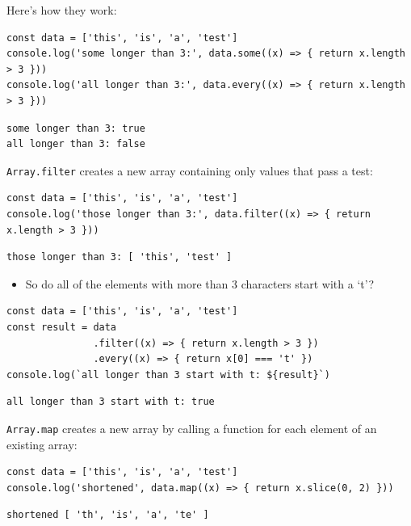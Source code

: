 Here's how they work:

\begin{verbatim}
const data = ['this', 'is', 'a', 'test']
console.log('some longer than 3:', data.some((x) => { return x.length > 3 }))
console.log('all longer than 3:', data.every((x) => { return x.length > 3 }))
\end{verbatim}

\begin{verbatim}
some longer than 3: true
all longer than 3: false
\end{verbatim}

\texttt{Array.filter} creates a new array containing only values that
pass a test:

\begin{verbatim}
const data = ['this', 'is', 'a', 'test']
console.log('those longer than 3:', data.filter((x) => { return x.length > 3 }))
\end{verbatim}

\begin{verbatim}
those longer than 3: [ 'this', 'test' ]
\end{verbatim}

\begin{itemize}
\tightlist
\item
  So do all of the elements with more than 3 characters start with a
  `t'?
\end{itemize}

\begin{verbatim}
const data = ['this', 'is', 'a', 'test']
const result = data
               .filter((x) => { return x.length > 3 })
               .every((x) => { return x[0] === 't' })
console.log(`all longer than 3 start with t: ${result}`)
\end{verbatim}

\begin{verbatim}
all longer than 3 start with t: true
\end{verbatim}

\texttt{Array.map} creates a new array by calling a function for each
element of an existing array:

\begin{verbatim}
const data = ['this', 'is', 'a', 'test']
console.log('shortened', data.map((x) => { return x.slice(0, 2) }))
\end{verbatim}

\begin{verbatim}
shortened [ 'th', 'is', 'a', 'te' ]
\end{verbatim}


